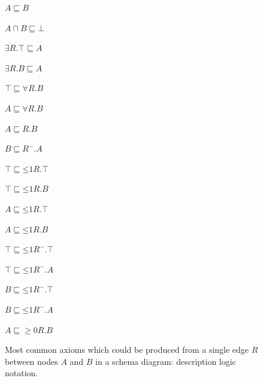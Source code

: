 \begin{figure}[tb]
\begin{center}
\begin{minipage}{.3\textwidth}
\begin{compactenum}
\item $A \sqsubseteq B$
\item $A\sqcap B\sqsubseteq \bot$
\item $\exists R.\top \sqsubseteq A$
\item $\exists R.B\sqsubseteq A$
\item $\top \sqsubseteq \forall R.B$ 
\item $A\sqsubseteq \forall R.B$
\end{compactenum}
\end{minipage}
\begin{minipage}{.3\textwidth}
\begin{compactenum}
\setcounter{enumi}{5}
\item $A\sqsubseteq R.B$
\item $B\sqsubseteq R^-.A$
\item $\top \sqsubseteq \mathord{\leq} 1 R.\top$ 
\item $\top \sqsubseteq \mathord{\leq} 1 R.B$
\item $A\sqsubseteq \mathord{\leq} 1 R.\top$
\item $A\sqsubseteq \mathord{\leq} 1 R.B$
\end{compactenum}
\end{minipage}
\begin{minipage}{.3\textwidth}
\begin{compactenum}
\setcounter{enumi}{10}
\item $\top \sqsubseteq \mathord{\leq} 1 R^-.\top$ 
\item $\top \sqsubseteq \mathord{\leq} 1 R^-.A$
\item $B \sqsubseteq \mathord{\leq} 1 R^-.\top$ 
\item $B \sqsubseteq \mathord{\leq} 1 R^-.A$
\item $A \sqsubseteq \mathord{\geq 0} R.B$
\end{compactenum}
\end{minipage}
\caption{Most common axioms which could be produced from a single edge $R$ between nodes $A$ and $B$ in a schema diagram: description logic notation.}\label{fig:generic-triple-axioms-DL}
\end{center}
\end{figure}

